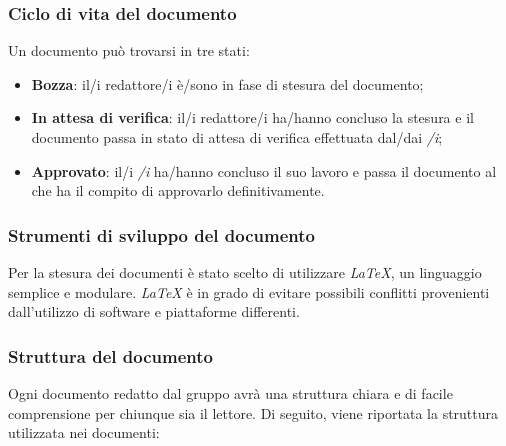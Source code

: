 		\subsubsection{Ciclo di vita del documento}
		Un documento può trovarsi in tre stati:
		\begin{itemize}
			\item \textbf{Bozza}: il/i redattore/i è/sono in fase di stesura del documento;
			\item \textbf{In attesa di verifica}: il/i redattore/i ha/hanno concluso la stesura e il documento passa in stato di attesa di verifica effettuata dal/dai \textit{\Ver/i};
			\item \textbf{Approvato}: il/i \textit{\Ver/i} ha/hanno concluso il suo lavoro e passa il documento al \textit{\RdP} che ha il compito di approvarlo definitivamente.
		\end{itemize}
		
		\subsubsection{Strumenti di sviluppo del documento}
		Per la stesura dei documenti è stato scelto di utilizzare \textit{\LaTeX{}}, un linguaggio semplice e modulare. \textit{\LaTeX{}} è in grado di evitare possibili conflitti provenienti dall’utilizzo di software e piattaforme differenti.
	
		\subsubsection{Struttura del documento}
		Ogni documento redatto dal gruppo avrà una struttura chiara e di facile comprensione per chiunque sia il lettore. Di seguito, viene riportata la struttura utilizzata nei documenti:

